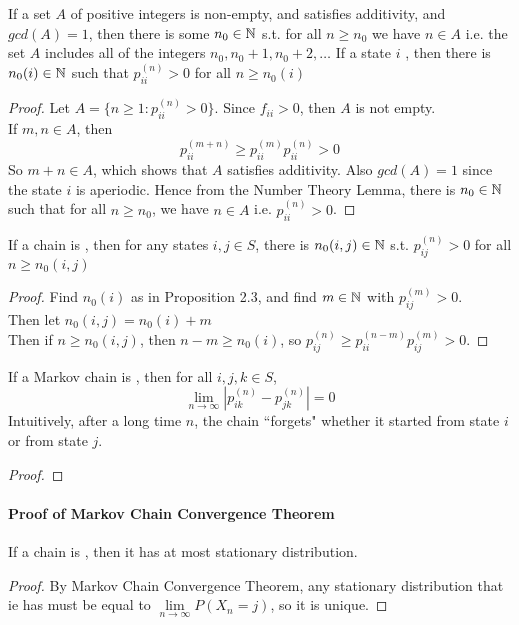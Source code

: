 \documentclass[11pt]{article}
\newcommand{\dur}[3]{{#1}_{#2}^{({#3})}}
\renewcommand{\limit}[1]{\underset{{#1} \rightarrow \infty}{\lim}}
\begin{document}
     If a set $A$ of positive integers is non-empty, and satisfies additivity, and $gcd(A) = 1$, then there is some $n_0 \in \mathbb{N}$ s.t. for all $n \geq n_0$ we have $n \in A$ i.e. the set $A$ includes all of the integers $n_0, n_0 + 1, n_0 + 2, \hdots$
    \proposition If a state $i$ , then there is $n_0(i) \in \mathbb{N}$ such that $p_{ii}^{(n)} > 0$ for all $n \geq n_0(i)$
    \begin{proof}
    	Let $A = \{ n \geq 1: \dur{p}{ii}{n} > 0\}$. Since $f_{ii} > 0$, then $A$ is not empty.\\
    	If $m, n \in A$, then $$\dur{p}{ii}{m+n} \geq \dur{p}{ii}{m} \dur{p}{ii}{n} > 0$$
    	So $m+n \in A$, which shows that $A$ satisfies additivity. Also $gcd(A) = 1$ since the state $i$ is aperiodic. Hence from the Number Theory Lemma, there is $n_0 \in \mathbb{N}$ such that for all $n \geq n_0$, we have $n \in A$ i.e. $\dur{p}{ii}{n} > 0$.
    	
    \end{proof}
    
    \corollary If a chain is , then for any states $i, j \in S$, there is $n_0(i,j) \in \mathbb{N}$ s.t. $p_{ij}^{(n)} > 0$ for all $n \geq n_0(i, j)$
    \begin{proof}
    	Find $n_0(i)$ as in Proposition 2.3, and find $m \in \mathbb{N}$ with $p_{ij}^{(m)} > 0$.\\
    	Then let $n_0(i,j) = n_0(i) + m$ \\
    	Then if $n \geq n_0(i,j)$, then $n - m \geq n_0(i)$, so $\dur{p}{ij}{n} \geq \dur{p}{ii}{n-m}\dur{p}{ij}{m} > 0$.
    \end{proof}
    
     If a Markov chain is , then for all $i, j, k \in S$, 
    $$\limit{n} \left| \dur{p}{ik}{n} - \dur{p}{jk}{n} \right | = 0$$
    \remark
    Intuitively, after a long time $n$, the chain ``forgets" whether it started from state $i$ or from state $j$.
    \begin{proof}
    \end{proof}
    \paragraph{Proof of Markov Chain Convergence Theorem}
    \corollary If a chain is , then it has at most  stationary distribution.
    \begin{proof}
    	By Markov Chain Convergence Theorem, any stationary distribution that ie has must be equal to $\limit{n} P(X_n = j)$, so it is unique.
    \end{proof}
    
\end{document}
